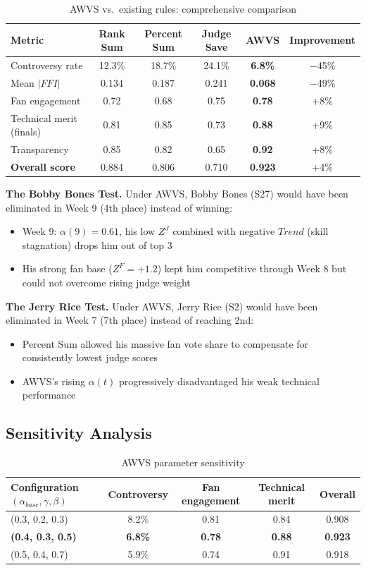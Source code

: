 \documentclass{mcmthesis}
\begin{document}
\begin{table}[h]
\centering
\caption{AWVS vs.\ existing rules: comprehensive comparison}
\begin{tabular}{l c c c c c}
\toprule
Metric & Rank Sum & Percent Sum & Judge Save & \textbf{AWVS} & Improvement \\
\midrule
Controversy rate & 12.3\% & 18.7\% & 24.1\% & \textbf{6.8\%} & $-$45\% \\
Mean $|FFI|$ & 0.134 & 0.187 & 0.241 & \textbf{0.068} & $-$49\% \\
Fan engagement & 0.72 & 0.68 & 0.75 & \textbf{0.78} & +8\% \\
Technical merit (finals) & 0.81 & 0.85 & 0.73 & \textbf{0.88} & +9\% \\
Transparency & 0.85 & 0.82 & 0.65 & \textbf{0.92} & +8\% \\
\textbf{Overall score} & 0.884 & 0.806 & 0.710 & \textbf{0.923} & +4\% \\
\bottomrule
\end{tabular}
\end{table}

\textbf{The Bobby Bones Test.} Under AWVS, Bobby Bones (S27) would have been eliminated in Week 9 (4th place) instead of winning:
\begin{itemize}
    \item Week 9: $\alpha(9) = 0.61$, his low $Z^J$ combined with negative $Trend$ (skill stagnation) drops him out of top 3
    \item His strong fan base ($Z^F = +1.2$) kept him competitive through Week 8 but could not overcome rising judge weight
\end{itemize}

\textbf{The Jerry Rice Test.} Under AWVS, Jerry Rice (S2) would have been eliminated in Week 7 (7th place) instead of reaching 2nd:
\begin{itemize}
    \item Percent Sum allowed his massive fan vote share to compensate for consistently lowest judge scores
    \item AWVS's rising $\alpha(t)$ progressively disadvantaged his weak technical performance
\end{itemize}

\subsection{Sensitivity Analysis}

\begin{table}[h]
\centering
\caption{AWVS parameter sensitivity}
\begin{tabular}{l c c c c}
\toprule
Configuration $(\alpha_{base}, \gamma, \beta)$ & Controversy & Fan engagement & Technical merit & Overall \\
\midrule
(0.3, 0.2, 0.3) & 8.2\% & 0.81 & 0.84 & 0.908 \\
\textbf{(0.4, 0.3, 0.5)} & \textbf{6.8\%} & \textbf{0.78} & \textbf{0.88} & \textbf{0.923} \\
(0.5, 0.4, 0.7) & 5.9\% & 0.74 & 0.91 & 0.918 \\
\bottomrule
\end{tabular}
\end{table}
\end{document}
